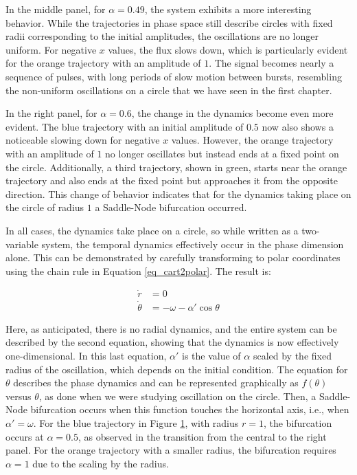 \documentclass{article}
\begin{document}
In the middle panel, for $\alpha = 0.49$, the system exhibits a more interesting behavior. 
While the trajectories in phase space still describe circles with fixed radii corresponding to the initial amplitudes, the oscillations are no longer uniform. For negative $x$ values, the flux slows down, which is particularly evident for the orange trajectory with an amplitude of $1$. 
The signal becomes nearly a sequence of pulses, with long periods of slow motion between bursts, resembling the non-uniform oscillations on a circle that we have seen in the first chapter. 

In the right panel, for $\alpha = 0.6$, the change in the dynamics become even more evident. 
The blue trajectory with an initial amplitude of $0.5$ now also shows a noticeable slowing down for negative $x$ values. 
However, the orange trajectory with an amplitude of $1$ no longer oscillates but instead ends at a fixed point on the circle. 
Additionally, a third trajectory, shown in green, starts near the orange trajectory and also ends at the fixed point but approaches it from the opposite direction. 
This change of behavior indicates that for the dynamics taking place on the circle of radius $1$ a Saddle-Node bifurcation occurred.

\begin{figure} [h]
    \centerline{}
    \caption{}
    \label{fig_selfmod}
\end{figure}

In all cases, the dynamics take place on a circle, so while written as a two-variable system, the temporal dynamics effectively occur in the phase dimension alone. This can be demonstrated by carefully transforming to polar coordinates using the chain rule in Equation \ref{eq_cart2polar}. The result is:

\begin{subequations} \label{eq_self_coupled_oscillator_polar}
\begin{align} 
    \dot{r} & = 0 \\
    \dot{\theta} & = -\omega - \alpha' \cos{\theta}
\end{align}
\end{subequations}

Here, as anticipated, there is no radial dynamics, and the entire system can be described by the second equation, showing that the dynamics is now effectively one-dimensional.
In this last equation, $\alpha'$ is the value of $\alpha$ scaled by the fixed radius of the oscillation, which depends on the initial condition. 
The equation for $\theta$ describes the phase dynamics and can be represented graphically as $f(\theta)$ versus $\theta$, as done when we were studying oscillation on the circle. 
Then, a Saddle-Node bifurcation occurs when this function touches the horizontal axis, i.e., when $\alpha' = \omega$. For the blue trajectory in Figure \ref{fig_selfmod}, with radius $r = 1$, the bifurcation occurs at $\alpha = 0.5$, as observed in the transition from the central to the right panel. For the orange trajectory with a smaller radius, the bifurcation requires $\alpha = 1$ due to the scaling by the radius.
\end{document}
